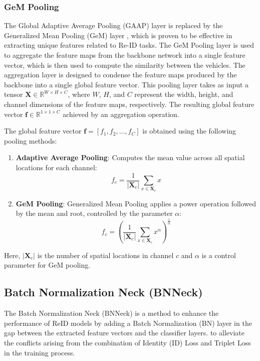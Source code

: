 \subsubsection{GeM Pooling}
\label{subsubsec:GeMPooling}
The Global Adaptive Average Pooling (GAAP) layer is replaced by the Generalized Mean Pooling (GeM) layer \cite{GeMPooling, FastReID}, which is proven to be effective in extracting unique features related to Re-ID tasks. The GeM Pooling layer is used to aggregate the feature maps from the backbone network into a single feature vector, which is then used to compute the similarity between the vehicles. The aggregation layer is designed to condense the feature maps produced by the backbone into a single global feature vector. This pooling layer takes as input a tensor $\mathbf{X} \in \mathbb{R}^{W \times H \times C}$, where $W$, $H$, and $C$ represent the width, height, and channel dimensions of the feature maps, respectively. The resulting global feature vector $\mathbf{f} \in \mathbb{R}^{1 \times 1 \times C}$ achieved by an aggregation operation.

The global feature vector $\mathbf{f} = [f_1, f_2, \dots, f_C]$ is obtained using the following pooling methods:

\begin{enumerate}
    \item \textbf{Adaptive Average Pooling}: Computes the mean value across all spatial locations for each channel:
    \begin{equation}
    f_c = \frac{1}{|\mathbf{X}_c|} \sum_{x \in \mathbf{X}_c} x
    \end{equation}

    \item \textbf{GeM Pooling}: Generalized Mean Pooling applies a power operation followed by the mean and root, controlled by the parameter $\alpha$:
    \begin{equation}
    f_c = \left( \frac{1}{|\mathbf{X}_c|} \sum_{x \in \mathbf{X}_c} x^\alpha \right)^{\frac{1}{\alpha}}
    \end{equation}
\end{enumerate}

Here, $|\mathbf{X}_c|$ is the number of spatial locations in channel $c$ and $\alpha$ is a control parameter for GeM pooling.

\subsection{Batch Normalization Neck (BNNeck)}
\label{subsec:BNNeck}
The Batch Normalization Neck (BNNeck) \cite{StrongBaselineBatchNorm} is a method to enhance the performance of ReID models by adding a Batch Normalization (BN) layer in the gap between the extracted feature vectors and the classifier layers. to alleviate the conflicts arising from the combination of Identity (ID) Loss and Triplet Loss in the training process.

